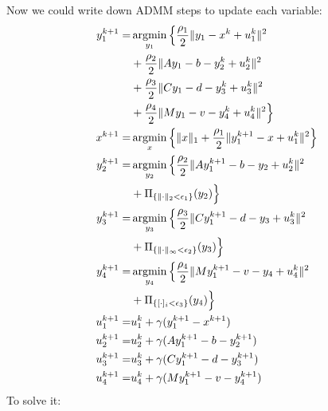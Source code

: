 \documentclass[review]{acmsiggraph}
\begin{document}
Now we could write down ADMM steps to update each variable: 
\begin{align}
y_1^{k+1}=&\operatornamewithlimits{argmin}\limits_{y_1} \Big\{\frac{\rho_1}{2}\|y_1-x^k+u_1^k\|^2\notag\\
&+\frac{\rho_2}{2}\|Ay_1-b-y_2^k+u_2^k\|^2\notag\\
&+\frac{\rho_3}{2}\|Cy_1-d-y_3^k+u_3^k\|^2\notag\\
&+\frac{\rho_4}{2}\|My_1-v-y_4^k+u_4^k\|^2 \Big\} \\
x^{k+1}=&\operatornamewithlimits{argmin}\limits_{x} \Big\{\|x\|_1+\frac{\rho_1}{2}\|y_1^{k+1}-x+u_1^k\|^2\Big\}\\
y_2^{k+1}=&\operatornamewithlimits{argmin}\limits_{y_2} \Big\{\frac{\rho_2}{2}\|Ay_1^{k+1}-b-y_2+u_2^k\|^2\notag\\&+\Pi_{\{\|\cdot\|_2<\epsilon_1\}}(y_2)\Big\}\\
y_3^{k+1}=&\operatornamewithlimits{argmin}\limits_{y_3} \Big\{\frac{\rho_3}{2}\|Cy_1^{k+1}-d-y_3+u_3^k\|^2\notag\\&+\Pi_{\{\|\cdot\|_{\infty}<\epsilon_2\}}(y_3)\Big\}\\
y_4^{k+1}=&\operatornamewithlimits{argmin}\limits_{y_4} \Big\{\frac{\rho_4}{2}\|My_1^{k+1}-v-y_4+u_4^k\|^2\notag\\&+\Pi_{\{[\cdot]_i<\epsilon_3\}}(y_4)\Big\}\\
u_1^{k+1}=&u_1^k+\gamma(y_1^{k+1}-x^{k+1})\\
u_2^{k+1}=&u_2^k+\gamma(Ay_1^{k+1}-b-y_2^{k+1})\\
u_3^{k+1}=&u_3^k+\gamma(Cy_1^{k+1}-d-y_3^{k+1})\\
u_4^{k+1}=&u_4^k+\gamma(My_1^{k+1}-v-y_4^{k+1})\\
\end{align}
To solve it:
\end{document}

